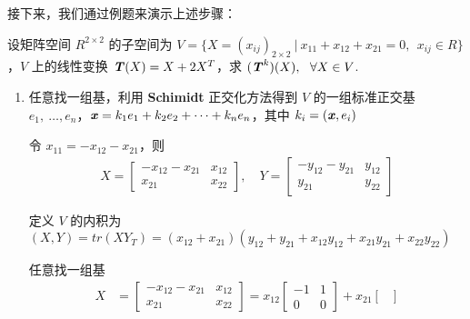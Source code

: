             \par 接下来，我们通过例题来演示上述步骤：
            \begin{problem}
                设矩阵空间 $R^{2 \times 2}$ 的子空间为 $V = \{X = (x_{ij})_{2 \times 2} \ | \ x_{11} + x_{12} + x_{21} = 0,\ \ x_{ij} \in R\}$，$V$ 上的线性变换 $\textbf{\textit{T}}(X) = X + 2X^T$，求 $(\textbf{\textit{T}}^k)(X), \ \ \forall X \in V$.
            \end{problem}
            \begin{solution}
                \begin{enumerate}
                    \item 任意找一组基，利用 \textbf{Schimidt} 正交化方法得到 $V$ 的一组标准正交基 $e_1, \ \dots, e_n$，$\textbf{\textit{x}} = k_1e_1 + k_2e_2 + \dots + k_ne_n$，其中 $k_i = (\textbf{\textit{x}}, e_i)$
                        \par 令 $x_{11} = - x_{12} - x_{21}$，则 
                        \begin{align*}
                            X = \begin{bmatrix}
                                -x_{12}-x_{21} & x_{12} \\ x_{21} & x_{22}
                            \end{bmatrix}, \quad Y = \begin{bmatrix}
                                -y_{12}-y_{21} & y_{12} \\ y_{21} & y_{22}
                            \end{bmatrix}
                        \end{align*}
                        \par 定义 $V$ 的内积为 $(X, Y) = tr(XY_T) = (x_{12} + x_{21})(y_{12} + y_{21} + x_{12}y_{12} + x_{21} y_{21} + x_{22}y_{22})$
                        \par 任意找一组基 
                            \begin{align*}
                                X &= \begin{bmatrix}
                                    -x_{12}-x_{21} & x_{12} \\ x_{21} & x_{22}
                                \end{bmatrix} = x_{12}\begin{bmatrix}
                                    -1 & 1 \\ 0 & 0
                                \end{bmatrix} + x_{21}\begin{bmatrix}

\end{bmatrix}
\end{align*}
\end{enumerate}
\end{solution}
